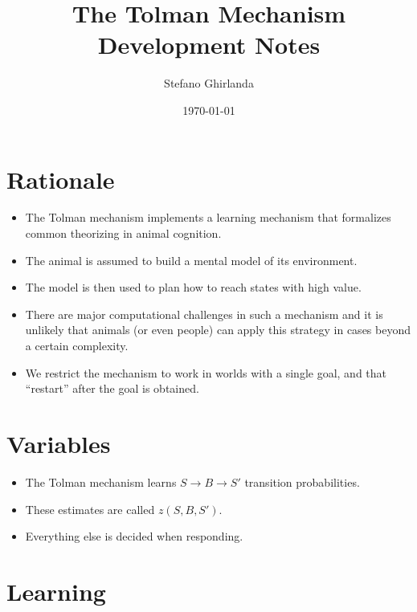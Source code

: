 \documentclass[11pt]{article}
\author{Stefano Ghirlanda}
\date{\today}
\title{The Tolman Mechanism\\\medskip
\large Development Notes}
\begin{document}
\maketitle

\section{Rationale}
\label{sec:org0d8da31}

\begin{itemize}
\item The Tolman mechanism implements a learning mechanism that formalizes
common theorizing in animal cognition.
\item The animal is assumed to build a mental model of its environment.
\item The model is then used to plan how to reach states with high value.
\item There are major computational challenges in such a mechanism and it
is unlikely that animals (or even people) can apply this strategy
in cases beyond a certain complexity.
\item We restrict the mechanism to work in worlds with a single goal, and
that ``restart'' after the goal is obtained.
\end{itemize}

\section{Variables}
\label{sec:org07d817a}

\begin{itemize}
\item The Tolman mechanism learns \(S\to B\to S'\) transition
probabilities.
\item These estimates are called \(z(S,B,S')\).
\item Everything else is decided when responding.
\end{itemize}

\section{Learning}
\label{sec:orge3433ed}
\end{document}
